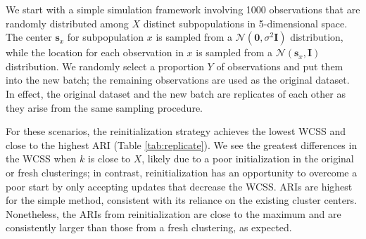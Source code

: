 \documentclass{article}
\begin{document}
We start with a simple simulation framework involving 1000 observations that are randomly distributed among $X$ distinct subpopulations in 5-dimensional space.
The center $\mathbf{s}_x$ for subpopulation $x$ is sampled from a $\mathcal{N}(\mathbf{0}, \sigma^2 \mathbf{I})$ distribution,
while the location for each observation in $x$ is sampled from a $\mathcal{N}(\mathbf{s}_x, \mathbf{I})$ distribution.
We randomly select a proportion $Y$ of observations and put them into the new batch; the remaining observations are used as the original dataset.
In effect, the original dataset and the new batch are replicates of each other as they arise from the same sampling procedure.

For these scenarios, the reinitialization strategy achieves the lowest WCSS and close to the highest ARI (Table \ref{tab:replicate}).
We see the greatest differences in the WCSS when $k$ is close to $X$, likely due to a poor initialization in the original or fresh clusterings;
in contrast, reinitialization has an opportunity to overcome a poor start by only accepting updates that decrease the WCSS.
ARIs are highest for the simple method, consistent with its reliance on the existing cluster centers.
Nonetheless, the ARIs from reinitialization are close to the maximum and are consistently larger than those from a fresh clustering, as expected.
\end{document}
